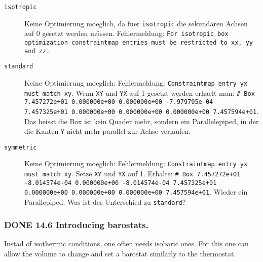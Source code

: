 \documentclass[11pt]{article}
\begin{document}
\begin{itemize}
\begin{enumerate}
\begin{description}
\item [\texttt{isotropic}] Keine Optimierung moeglich, da fuer \texttt{isotropic} die sekundären Achsen auf 0 gesetzt werden müssen. Fehlermeldung: \texttt{For isotropic box optimization constraintmap entries must be restricted to xx, yy and zz.}
\item [\texttt{standard}] Keine Optimierung moeglich: Fehlermeldung: \texttt{Constraintmap entry yx must match xy}. Wenn \texttt{XY} und \texttt{YX} auf 1 gesetzt werden erhaelt man: \texttt{\# Box   7.457272e+01    0.000000e+00    0.000000e+00    -7.979795e-04   7.457325e+01    0.000000e+00    0.000000e+00    0.000000e+00    7.457594e+01}. 
                   Das heisst die Box ist kein Quader mehr, sondern ein Parallelepiped, in der die Kanten \texttt{Y} nicht mehr parallel zur Achse verlaufen.
\item [\texttt{symmetric}] Keine Optimierung moeglich: Fehlermeldung: \texttt{Constraintmap entry yx must match xy}. Setze \texttt{XY} und \texttt{YX} auf 1. Erhalte: \texttt{\# Box   7.457272e+01    -8.014574e-04   0.000000e+00    -8.014574e-04   7.457325e+01    0.000000e+00    0.000000e+00    0.000000e+00    7.457594e+01}. 
                    Wieder ein Parallepiped. Was ist der Unterschied zu \texttt{standard}?
\end{description}

\end{enumerate}
\end{itemize} %
\subsubsection{\textbf{DONE} 14.6 Introducing barostats.}
\label{sec-2.4.6}

      Instad of isothermic conditions, one often needs isobaric ones. For this one can allow the volume to change and set a barostat similarly to the thermostat. 
      
\end{document}
